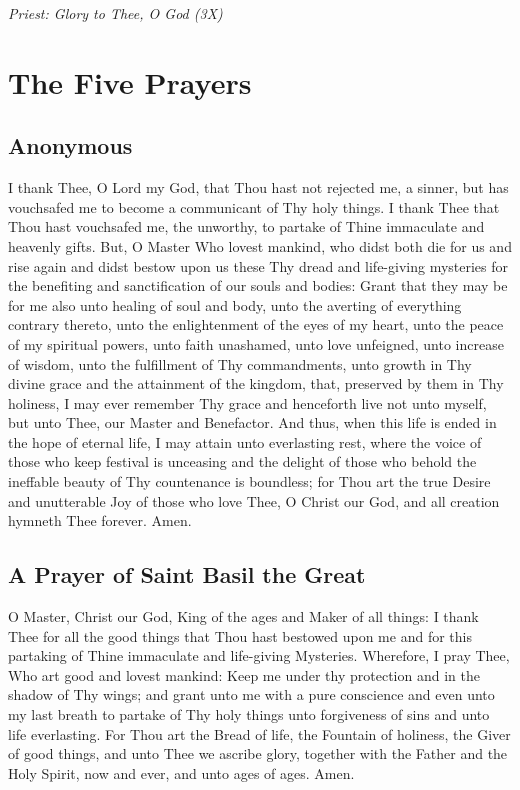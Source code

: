 \emph{Priest: Glory to Thee, O God (3X)}

\section*{The Five Prayers}
\subsection*{Anonymous}
I thank Thee, O Lord my God,
that Thou hast not rejected me, a sinner,
but has vouchsafed me to become a communicant of Thy holy things.
I thank Thee that Thou hast vouchsafed me, the unworthy,
to partake of Thine immaculate and heavenly gifts.
But, O Master Who lovest mankind,
who didst both die for us and rise again and didst bestow
upon us these Thy dread and life-giving mysteries 
for the benefiting and sanctification of our souls and bodies:
Grant that they may be for me also unto healing of soul and body,
unto the averting of everything contrary thereto,
unto the enlightenment of the eyes of my heart,
unto the peace of my spiritual powers, unto faith unashamed,
unto love unfeigned, unto increase of wisdom,
unto the fulfillment of Thy commandments,
unto growth in Thy divine grace and the attainment of the kingdom,
that, preserved by them in Thy holiness,
I may ever remember Thy grace and henceforth live not unto myself,
but unto Thee, our Master and Benefactor.
And thus, when this life is ended in the hope of eternal life,
I may attain unto everlasting rest,
where the voice of those who keep festival is unceasing
and the delight of those who behold the ineffable beauty of Thy
countenance is boundless; 
for Thou art the true Desire and unutterable Joy of those 
who love Thee, O Christ our God, 
and all creation hymneth Thee forever. Amen.

\subsection*{A Prayer of Saint Basil the Great}
O Master, Christ our God, King of the ages and Maker of all things:
I thank Thee for all the good things that Thou hast bestowed upon me
and for this partaking of Thine immaculate and life-giving 
Mysteries. Wherefore, I pray Thee, Who art good and lovest mankind:
Keep me under thy protection and in the shadow of Thy wings;
and grant unto me with a pure conscience and even unto my last
breath to partake of Thy holy things unto forgiveness of sins
and unto life everlasting.
For Thou art the Bread of life, the Fountain of holiness,
the Giver of good things, and unto Thee we ascribe glory,
together with the Father and the Holy Spirit, now and ever,
and unto ages of ages. Amen.

